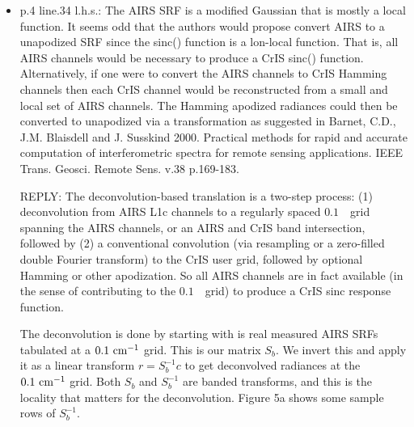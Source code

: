 \documentclass[11pt]{article}
\newcommand {\reply} {\mbox{\small REPLY}}
\begin{document}
\begin{itemize}
  \reply: We agree there is no loss in interferometric resolution
  with an invertible apodization.  Hamming apodization does reduce
  resolving power $R = v_i/ \fwhm_i$, since it increases $\fwhm$
  while decreasing the side-lobes.  We changed ``resolution'' to
  ``resolving power'' and set Barnet et al. 2000 as noted below as
  our first citation for apodization, for the sentence in question.


  
\item p.4 line.34 l.h.s.: The AIRS SRF is a modified Gaussian that
  is mostly a local function. It seems odd that the authors would
  propose convert AIRS to a unapodized SRF since the sinc() function
  is a lon-local function. That is, all AIRS channels would be
  necessary to produce a CrIS sinc() function. Alternatively, if one
  were to convert the AIRS channels to CrIS Hamming channels then
  each CrIS channel would be reconstructed from a small and local
  set of AIRS channels. The Hamming apodized radiances could then be
  converted to unapodized via a transformation as suggested in
  Barnet, C.D., J.M. Blaisdell and J.  Susskind 2000. Practical
  methods for rapid and accurate computation of interferometric
  spectra for remote sensing applications. IEEE
  Trans. Geosci. Remote Sens. v.38 p.169-183.

  \reply: The deconvolution-based translation is a two-step process:
  (1) deconvolution from AIRS L1c channels to a regularly spaced
  $0.1$~\wn\ grid spanning the AIRS channels, or an AIRS and CrIS
  band intersection, followed by (2) a conventional convolution 
  (via resampling or a zero-filled double Fourier transform) to the
  CrIS user grid, followed by optional Hamming or other apodization.
  So all AIRS channels are in fact available (in the sense of
  contributing to the $0.1$~\wn\ grid) to produce a CrIS sinc
  response function.

  The deconvolution is done by starting with is real measured AIRS
  SRFs tabulated at a $0.1~\mbox{cm$^{-1}$}$ grid.  This is our matrix $S_b$.  We
  invert this and apply it as a linear transform $r = S_b^{-1} c$ to
  get deconvolved radiances at the $0.1~\mbox{cm$^{-1}$}$ grid.  Both $S_b$ and 
  $S_b^{-1}$ are banded transforms, and this is the locality that
  matters for the deconvolution.  Figure 5a shows some sample rows of
  $S_b^{-1}$.


\end{itemize}
\end{document}
